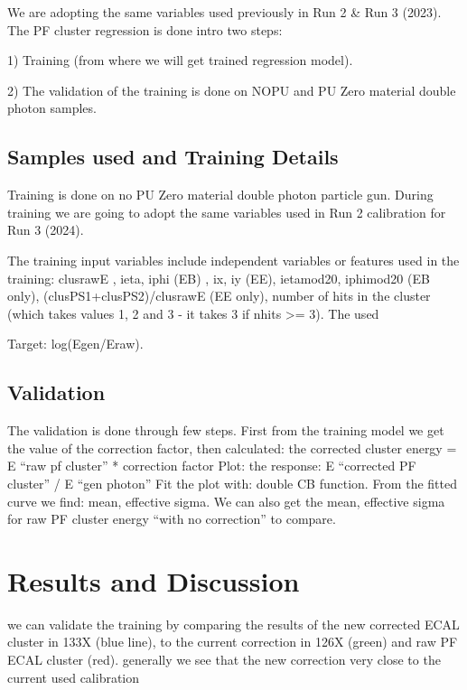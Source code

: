 We are adopting the same variables used previously in Run 2 & Run 3 (2023). The PF cluster regression is done intro two steps:  

1) Training (from where we will get trained regression model). 

2) The validation of the training is done on NOPU and PU Zero material double photon samples.

\subsection{Samples used and Training Details}

Training is done on no PU Zero material double photon particle gun. During training we are going to adopt the same variables used in Run 2 calibration for Run 3 (2024). 

The training input variables include independent variables or features used in the training:  
	clusrawE , ieta, iphi (EB) , ix, iy (EE), ietamod20, iphimod20 (EB only), (clusPS1+clusPS2)/clusrawE (EE only), number of hits in the cluster (which takes values 1, 2 and 3 - it takes 3 if nhits >= 3). The used  

Target: log(Egen/Eraw). 

 
\subsection{Validation}

The validation is done through few steps. First from the training model we get the value of the correction factor, then calculated:  the corrected cluster energy = E “raw pf cluster” * correction factor Plot: the response: E “corrected PF cluster” / E “gen photon” Fit the plot with: double CB function. From the fitted curve we find: mean, effective sigma. We can also get the mean, effective sigma for raw PF cluster energy “with no correction” to compare. 

\section{Results and Discussion}

we can validate the training by comparing the results of the new corrected ECAL cluster in 133X (blue line), to the current  correction in 126X (green) and  raw PF ECAL cluster (red).
generally we see that the new  correction very close to the current used calibration


